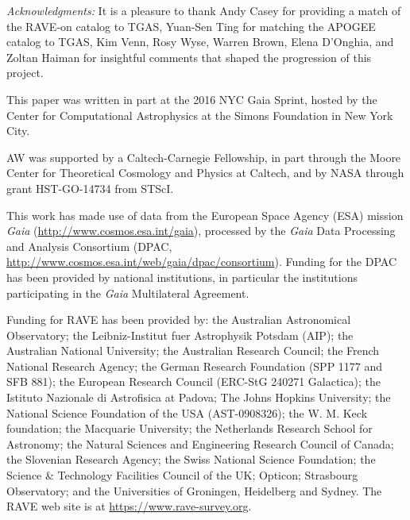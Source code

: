 \documentclass[apj, twocolappendix, numberedappendix, appendixfloats]{emulateapj}
\begin{document}
\vspace{0.5cm}
\emph{Acknowledgments:}
It is a pleasure to thank Andy Casey for providing a match of the RAVE-on catalog to TGAS, Yuan-Sen Ting for matching the APOGEE catalog to TGAS, Kim Venn, Rosy Wyse, Warren Brown, Elena D'Onghia, and Zoltan Haiman for insightful comments that shaped the progression of this project.


This paper was written in part at the 2016 NYC Gaia Sprint, hosted by the Center for Computational Astrophysics at the Simons Foundation in New York City.

AW was supported by a Caltech-Carnegie Fellowship, in part through the Moore Center for Theoretical Cosmology and Physics at Caltech, and by NASA through grant HST-GO-14734 from STScI.

This work has made use of data from the European Space Agency (ESA) mission {\it Gaia} (\url{http://www.cosmos.esa.int/gaia}), processed by the {\it Gaia} Data Processing and Analysis Consortium (DPAC, \url{http://www.cosmos.esa.int/web/gaia/dpac/consortium}). Funding for the DPAC has been provided by national institutions, in particular the institutions participating in the {\it Gaia} Multilateral Agreement.

Funding for RAVE has been provided by: the Australian Astronomical Observatory; the Leibniz-Institut fuer Astrophysik Potsdam (AIP); the Australian National University; the Australian Research Council; the French National Research Agency; the German Research Foundation (SPP 1177 and SFB 881); the European Research Council (ERC-StG 240271 Galactica); the Istituto Nazionale di Astrofisica at Padova; The Johns Hopkins University; the National Science Foundation of the USA (AST-0908326); the W. M. Keck foundation; the Macquarie University; the Netherlands Research School for Astronomy; the Natural Sciences and Engineering Research Council of Canada; the Slovenian Research Agency; the Swiss National Science Foundation; the Science \& Technology Facilities Council of the UK; Opticon; Strasbourg Observatory; and the Universities of Groningen, Heidelberg and Sydney.
The RAVE web site is at \url{https://www.rave-survey.org}.
\end{document}
